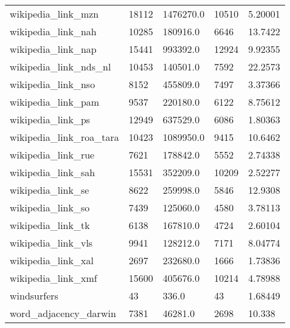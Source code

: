\begin{longtable}{lllll}
 wikipedia\_link\_mzn                                 & 18112      & 1476270.0   & 10510 & 5.20001    \\
 wikipedia\_link\_nah                                 & 10285      & 180916.0    & 6646  & 13.7422    \\
 wikipedia\_link\_nap                                 & 15441      & 993392.0    & 12924 & 9.92355    \\
 wikipedia\_link\_nds\_nl                              & 10453      & 140501.0    & 7592  & 22.2573    \\
 wikipedia\_link\_nso                                 & 8152       & 455809.0    & 7497  & 3.37366    \\
 wikipedia\_link\_pam                                 & 9537       & 220180.0    & 6122  & 8.75612    \\
 wikipedia\_link\_ps                                  & 12949      & 637529.0    & 6086  & 1.80363    \\
 wikipedia\_link\_roa\_tara                            & 10423      & 1089950.0   & 9415  & 10.6462    \\
 wikipedia\_link\_rue                                 & 7621       & 178842.0    & 5552  & 2.74338    \\
 wikipedia\_link\_sah                                 & 15531      & 352209.0    & 10209 & 2.52277    \\
 wikipedia\_link\_se                                  & 8622       & 259998.0    & 5846  & 12.9308    \\
 wikipedia\_link\_so                                  & 7439       & 125060.0    & 4580  & 3.78113    \\
 wikipedia\_link\_tk                                  & 6138       & 167810.0    & 4724  & 2.60104    \\
 wikipedia\_link\_vls                                 & 9941       & 128212.0    & 7171  & 8.04774    \\
 wikipedia\_link\_xal                                 & 2697       & 232680.0    & 1666  & 1.73836    \\
 wikipedia\_link\_xmf                                 & 15600      & 405676.0    & 10214 & 4.78988    \\
 windsurfers                                        & 43         & 336.0       & 43    & 1.68449    \\
 word\_adjacency\_darwin                              & 7381       & 46281.0     & 2698  & 10.338     \\

\end{longtable}
